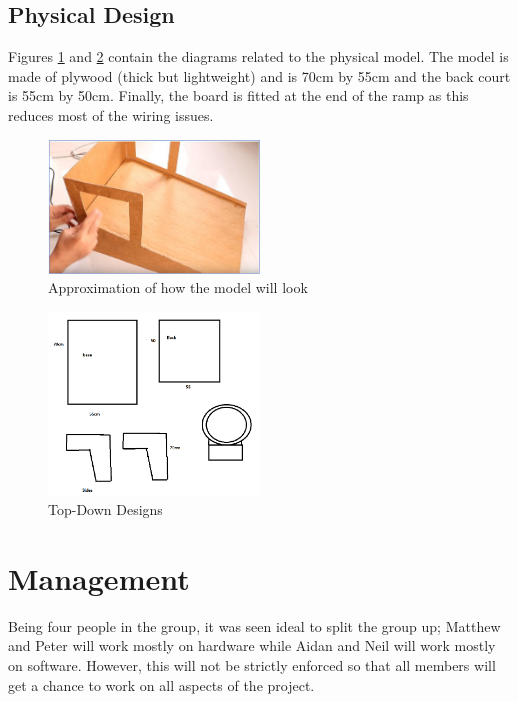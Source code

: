 \documentclass[11pt,a4paper,twocolumn]{article}
\begin{document}
\subsection{Physical Design}
Figures \ref{physical1} and \ref{physical2} contain the diagrams related to the physical model. The model is made of plywood (thick but lightweight) and is 70cm by 55cm and the back court is 55cm by 50cm. Finally, the board is fitted at the end of the ramp as this reduces most of the wiring issues.

\begin{figure}[!htb]
	\includegraphics[width=0.5\textwidth]{MeasurementsPic2.png}
\caption{Approximation of how the model will look \cite{model}}
\label{physical1}
\end{figure}

\begin{figure}[!htb]
	\includegraphics[width=0.5\textwidth]{MeasurementsPic1.png}
\caption{Top-Down Designs}
\label{physical2}
\end{figure}

\newpage
\section{Management}
\par{Being four people in the group, it was seen ideal to split the group up; Matthew and Peter will work mostly on hardware while Aidan and Neil will work mostly on software. However, this will not be strictly enforced so that all members will get a chance to work on all aspects of the project.}
\newline
\end{document}
